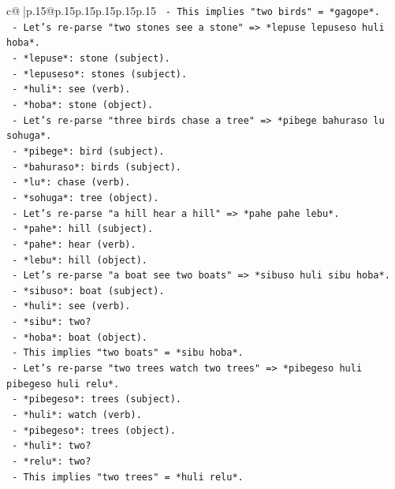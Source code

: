 \documentclass{article}
\begin{document}
{\begin{supertabular}{c@{$\;$}|p{.15\linewidth}@{}p{.15\linewidth}p{.15\linewidth}p{.15\linewidth}p{.15\linewidth}p{.15\linewidth}}
{{{\texttt{      {-} This implies "two birds" = *gagope*.} \\
\texttt{    {-} Let's re{-}parse "two stones see a stone" => *lepuse lepuseso huli hoba*.} \\
\texttt{      {-} *lepuse*: stone (subject).} \\
\texttt{      {-} *lepuseso*: stones (subject).} \\
\texttt{      {-} *huli*: see (verb).} \\
\texttt{      {-} *hoba*: stone (object).} \\
\texttt{    {-} Let's re{-}parse "three birds chase a tree" => *pibege bahuraso lu sohuga*.} \\
\texttt{      {-} *pibege*: bird (subject).} \\
\texttt{      {-} *bahuraso*: birds (subject).} \\
\texttt{      {-} *lu*: chase (verb).} \\
\texttt{      {-} *sohuga*: tree (object).} \\
\texttt{    {-} Let's re{-}parse "a hill hear a hill" => *pahe pahe lebu*.} \\
\texttt{      {-} *pahe*: hill (subject).} \\
\texttt{      {-} *pahe*: hear (verb).} \\
\texttt{      {-} *lebu*: hill (object).} \\
\texttt{    {-} Let's re{-}parse "a boat see two boats" => *sibuso huli sibu hoba*.} \\
\texttt{      {-} *sibuso*: boat (subject).} \\
\texttt{      {-} *huli*: see (verb).} \\
\texttt{      {-} *sibu*: two?} \\
\texttt{      {-} *hoba*: boat (object).} \\
\texttt{      {-} This implies "two boats" = *sibu hoba*.} \\
\texttt{    {-} Let's re{-}parse "two trees watch two trees" => *pibegeso huli pibegeso huli relu*.} \\
\texttt{      {-} *pibegeso*: trees (subject).} \\
\texttt{      {-} *huli*: watch (verb).} \\
\texttt{      {-} *pibegeso*: trees (object).} \\
\texttt{      {-} *huli*: two?} \\
\texttt{      {-} *relu*: two?} \\
\texttt{      {-} This implies "two trees" = *huli relu*.} \\
}}}
\end{supertabular}}
\end{document}
